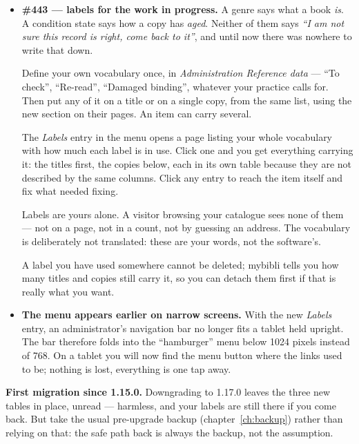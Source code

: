 \begin{itemize}
  \item \textbf{\#443 \string— labels for the work in progress.} A genre
        says what a book \emph{is}. A condition state says how a copy has
        \emph{aged}. Neither of them says \emph{``I am not sure this
        record is right, come back to it''}, and until now there was
        nowhere to write that down.

        Define your own vocabulary once, in
        \emph{Administration \textrightarrow{} Reference data}
        \string— ``To check'', ``Re-read'', ``Damaged binding'',
        whatever your practice calls for. Then put any of it on a title
        or on a single copy, from the same list, using the new section on
        their pages. An item can carry several.

        The \emph{Labels} entry in the menu opens a page listing your
        whole vocabulary with how much each label is in use. Click one
        and you get everything carrying it: the titles first, the copies
        below, each in its own table because they are not described by
        the same columns. Click any entry to reach the item itself and
        fix what needed fixing.

        \begin{tip}
        Labels are yours alone. A visitor browsing your catalogue sees
        none of them \string— not on a page, not in a count, not by
        guessing an address. The vocabulary is deliberately not
        translated: these are your words, not the software's.
        \end{tip}

        A label you have used somewhere cannot be deleted; mybibli tells
        you how many titles and copies still carry it, so you can detach
        them first if that is really what you want.
  \item \textbf{The menu appears earlier on narrow screens.} With the new
        \emph{Labels} entry, an administrator's navigation bar no longer
        fits a tablet held upright. The bar therefore folds into the
        ``hamburger'' menu below 1024 pixels instead of 768. On a tablet
        you will now find the menu button where the links used to be;
        nothing is lost, everything is one tap away.
\end{itemize}

\begin{warning}
\textbf{First migration since 1.15.0.} Downgrading to 1.17.0 leaves the
three new tables in place, unread \string— harmless, and your labels are
still there if you come back. But take the usual pre-upgrade backup
(chapter~\ref{ch:backup}) rather than relying on that: the safe path back
is always the backup, not the assumption.
\end{warning}

